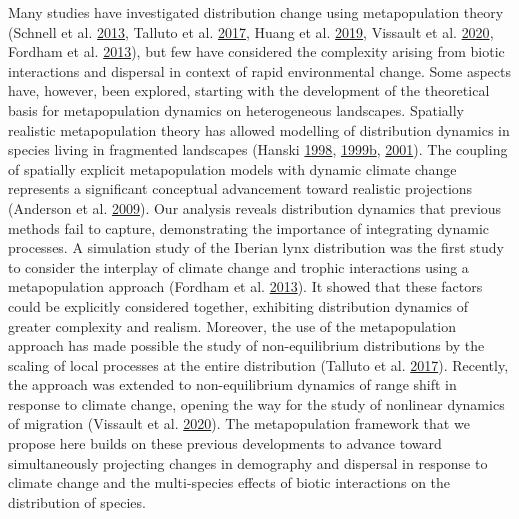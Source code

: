\documentclass[12pt]{article}
\begin{document}
Many studies have investigated distribution change using metapopulation
theory (Schnell et al.
\protect\hyperlink{ref-schnell_estimating_2013}{2013}, Talluto et al.
\protect\hyperlink{ref-talluto_extinction_2017}{2017}, Huang et al.
\protect\hyperlink{ref-huang_using_2019}{2019}, Vissault et al.
\protect\hyperlink{ref-vissault_slow_2020}{2020}, Fordham et al.
\protect\hyperlink{ref-fordham_adapted_2013}{2013}), but few have
considered the complexity arising from biotic interactions and dispersal
in context of rapid environmental change. Some aspects have, however,
been explored, starting with the development of the theoretical basis
for metapopulation dynamics on heterogeneous landscapes. Spatially
realistic metapopulation theory has allowed modelling of distribution
dynamics in species living in fragmented landscapes (Hanski
\protect\hyperlink{ref-hanski_metapopulation_1998}{1998},
\protect\hyperlink{ref-hanski_habitat_1999}{1999}\protect\hyperlink{ref-hanski_habitat_1999}{b},
\protect\hyperlink{ref-hanski_spatially_2001}{2001}). The coupling of
spatially explicit metapopulation models with dynamic climate change
represents a significant conceptual advancement toward realistic
projections (Anderson et al.
\protect\hyperlink{ref-anderson_dynamics_2009}{2009}). Our analysis
reveals distribution dynamics that previous methods fail to capture,
demonstrating the importance of integrating dynamic processes. A
simulation study of the Iberian lynx distribution was the first study to
consider the interplay of climate change and trophic interactions using
a metapopulation approach (Fordham et al.
\protect\hyperlink{ref-fordham_adapted_2013}{2013}). It showed that
these factors could be explicitly considered together, exhibiting
distribution dynamics of greater complexity and realism. Moreover, the
use of the metapopulation approach has made possible the study of
non-equilibrium distributions by the scaling of local processes at the
entire distribution (Talluto et al.
\protect\hyperlink{ref-talluto_extinction_2017}{2017}). Recently, the
approach was extended to non-equilibrium dynamics of range shift in
response to climate change, opening the way for the study of nonlinear
dynamics of migration (Vissault et al.
\protect\hyperlink{ref-vissault_slow_2020}{2020}). The metapopulation
framework that we propose here builds on these previous developments to
advance toward simultaneously projecting changes in demography and
dispersal in response to climate change and the multi-species effects of
biotic interactions on the distribution of species.
\end{document}
